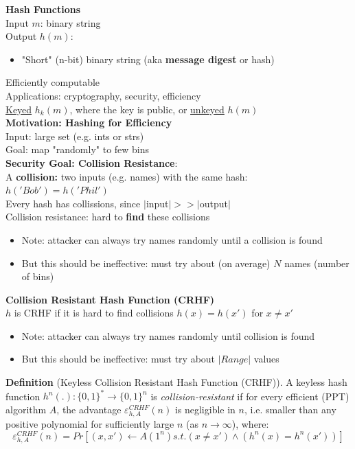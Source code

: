 \documentclass{article}
\begin{document}
\textbf{Hash Functions}\\
Input $m$: binary string\\
Output $h(m)$:
\begin{itemize}
	\item "Short" (n-bit) binary string (aka \textbf{message digest} or hash)
\end{itemize}
Efficiently computable\\
Applications: cryptography, security, efficiency\\
\underline{Keyed} $h_k(m)$, where the key is public, or \underline{unkeyed} $h(m)$\\

\textbf{Motivation: Hashing for Efficiency}\\
Input: large set (e.g. ints or strs)\\
Goal: map "randomly" to few bins\\

\textbf{Security Goal: Collision Resistance}:\\
A \textbf{collision:} two inputs (e.g. names) with the same hash: $h('Bob')=h('Phil')$\\
Every hash has collissions, since $|$input$| >> |$output$|$\\
Collision resistance: hard to \textbf{find} these collisions
\begin{itemize}
	\item Note: attacker can always try names randomly until a collision is found
	\item But this should be ineffective: must try about (on average) $N$ names (number of bins)
\end{itemize}

\textbf{Collision Resistant Hash Function (CRHF)}\\
$h$ is CRHF if it is hard to find collisions $h(x)=h(x')$ for $x\neq x'$
\begin{itemize}
	\item Note: attacker can always try names randomly until collision is found
	\item But this should be ineffective: must try about $|Range|$ values
\end{itemize}
\textbf{Definition} (Keyless Collision Resistant Hash Function (CRHF)). A keyless hash function $h^n(.) : \{0,1\}^* \rightarrow \{0,1\}^n$ is \textit{collision-resistant} if for every efficient (PPT) algorithm $A$, the advantage $\varepsilon^{CRHF}_{h,A}(n)$ is negligible in $n$, i.e. smaller than any positive polynomial for sufficiently large $n$ (as $n\rightarrow \infty$), where: \[
	\varepsilon^{CRHF}_{h,A}(n)=Pr\left[(x,x')\leftarrow A(1^n) s.t. (x\neq x') \wedge (h^n(x)=h^n(x'))\right]
\]
\end{document}
